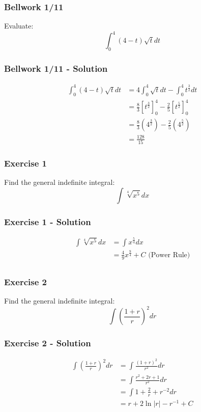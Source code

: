 \documentclass[12pt]{beamer}
\begin{document}
\begin{frame}
	\frametitle{Bellwork 1/11}
	\initclock

	\vfill
	\vfill
	\vfill
	\Large
	Evaluate:
	\[\int_{0}^{4}(4-t)\sqrt{t}dt\]
	\vfill
	\vfill
	\vfill
	\vfill
	\vfill

	\small
	\crono
\end{frame}
\begin{frame} 
	\frametitle{Bellwork 1/11 - Solution}

	\large
	\begin{align*}
		\int_{0}^{4}(4-t)\sqrt{t}dt &= 4\int_{0}^{4}\sqrt{t}dt-\int_{0}^{4}t^\frac{3}{2}dt \\
		&= \frac{8}{3}\left[t^\frac{3}{2}\right]_0^4 - \frac{2}{5}\left[t^\frac{5}{2}\right]_0^4 \\
		&= \frac{8}{3}\left(4^\frac{3}{2}\right) - \frac{2}{5}\left(4^\frac{5}{2}\right) \\
		&= \boxed{\frac{128}{15}}
	\end{align*}
\end{frame}
\begin{frame}
	\frametitle{Exercise 1}

	\vfill
	\vfill
	\vfill
	\Large
	Find the general indefinite integral:
	\vfill
	\[\int\sqrt[4]{x^5}dx\]
	\vfill
	\vfill
	\vfill
	\vfill
	\vfill
\end{frame}
\begin{frame}
	\frametitle{Exercise 1 - Solution}

	\large
	\begin{align*}
		\int\sqrt[4]{x^5}dx &= \int x^\frac{5}{4}dx \\
		&= \boxed{\frac{4}{9}x^\frac{9}{4}+C} \text{ (Power Rule)}\\
	\end{align*}
\end{frame}
\begin{frame}
	\frametitle{Exercise 2}

	\vfill
	\vfill
	\vfill
	\Large
	Find the general indefinite integral:
	\vfill
	\[\int\left(\frac{1+r}{r}\right)^2dr\]
	\vfill
	\vfill
	\vfill
	\vfill
	\vfill
\end{frame}
\begin{frame}
	\frametitle{Exercise 2 - Solution}

	\large
	\begin{align*}
		\int\left(\frac{1+r}{r}\right)^2dr &= \int \frac{(1+r)^2}{r^2}dr \\
		&= \int \frac{r^2+2r+1}{r^2}dr \\
		&= \int 1+\frac{2}{r}+r^{-2}dr \\
		&= \boxed{r+2\ln|r|-r^{-1}+C}
	\end{align*}
\end{frame}
\end{document}
